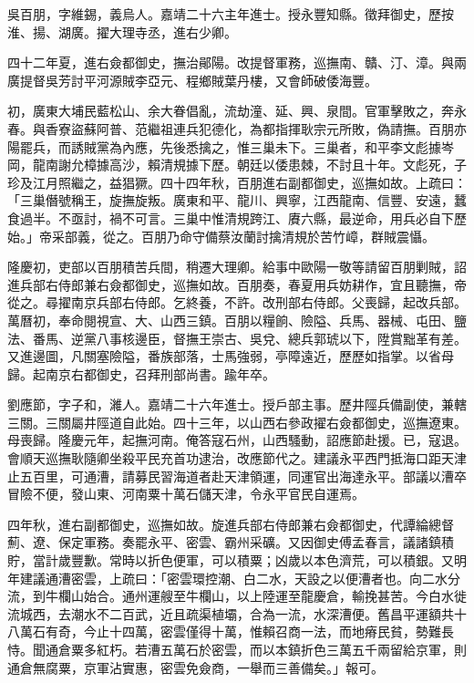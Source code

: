 \begin{pinyinscope}
吳百朋，字維錫，義烏人。嘉靖二十六主年進士。授永豐知縣。徵拜御史，歷按淮、揚、湖廣。擢大理寺丞，進右少卿。

四十二年夏，進右僉都御史，撫治鄖陽。改提督軍務，巡撫南、贛、汀、漳。與兩廣提督吳芳討平河源賊李亞元、程鄉賊葉丹樓，又會師破倭海豐。

初，廣東大埔民藍松山、余大眷倡亂，流劫潼、延、興、泉間。官軍擊敗之，奔永春。與香寮盜蘇阿普、范繼祖連兵犯德化，為都指揮耿宗元所敗，偽請撫。百朋亦陽罷兵，而誘賊黨為內應，先後悉擒之，惟三巢未下。三巢者，和平李文彪據岑岡，龍南謝允樟據高沙，賴清規據下歷。朝廷以倭患棘，不討且十年。文彪死，子珍及江月照繼之，益猖獗。四十四年秋，百朋進右副都御史，巡撫如故。上疏曰：「三巢僭號稱王，旋撫旋叛。廣東和平、龍川、興寧，江西龍南、信豐、安遠，蠶食過半。不亟討，禍不可言。三巢中惟清規跨江、賡六縣，最逆命，用兵必自下歷始。」帝采部義，從之。百朋乃命守備蔡汝蘭討擒清規於苦竹嶂，群賊震懾。

隆慶初，吏部以百朋積苦兵間，稍遷大理卿。給事中歐陽一敬等請留百朋剿賊，詔進兵部右侍郎兼右僉都御史，巡撫如故。百朋奏，春夏用兵妨耕作，宜且聽撫，帝從之。尋擢南京兵部右侍郎。乞終養，不許。改刑部右侍郎。父喪歸，起改兵部。萬曆初，奉命閱視宣、大、山西三鎮。百朋以糧餉、險隘、兵馬、器械、屯田、鹽法、番馬、逆黨八事核邊臣，督撫王崇古、吳兌、總兵郭琥以下，陞賞黜革有差。又進邊圖，凡關塞險隘，番族部落，士馬強弱，亭障遠近，歷歷如指掌。以省母歸。起南京右都御史，召拜刑部尚書。踰年卒。

劉應節，字子和，濰人。嘉靖二十六年進士。授戶部主事。歷井陘兵備副使，兼轄三關。三關屬井陘道自此始。四十三年，以山西右參政擢右僉都御史，巡撫遼東。母喪歸。隆慶元年，起撫河南。俺答寇石州，山西騷動，詔應節赴援。已，寇退。會順天巡撫耿隨卿坐殺平民充首功逮治，改應節代之。建議永平西門抵海口距天津止五百里，可通漕，請募民習海道者赴天津領運，同運官出海達永平。部議以漕卒冒險不便，發山東、河南粟十萬石儲天津，令永平官民自運焉。

四年秋，進右副都御史，巡撫如故。旋進兵部右侍郎兼右僉都御史，代譚綸總督薊、遼、保定軍務。奏罷永平、密雲、霸州采礦。又因御史傅孟春言，議諸鎮積貯，當計歲豐歉。常時以折色便軍，可以積粟；凶歲以本色濟荒，可以積銀。又明年建議通漕密雲，上疏曰：「密雲環控潮、白二水，天設之以便漕者也。向二水分流，到牛欄山始合。通州運艘至牛欄山，以上陸運至龍慶倉，輸挽甚苦。今白水徙流城西，去潮水不二百武，近且疏渠植壩，合為一流，水深漕便。舊昌平運額共十八萬石有奇，今止十四萬，密雲僅得十萬，惟賴召商一法，而地瘠民貧，勢難長恃。聞通倉粟多紅朽。若漕五萬石於密雲，而以本鎮折色三萬五千兩留給京軍，則通倉無腐粟，京軍沾實惠，密雲免僉商，一舉而三善備矣。」報可。


\end{pinyinscope}
